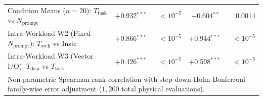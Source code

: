 \begin{table}[t]
\begin{tabular}{l r r r r}
Condition Means ($n=20$): $T_{\text{task}}$ vs $N_{\text{prompt}}$ & +0.932$^{***}$ & $< 10^{-5}$ & +0.604$^{**}$ & 0.0014 \\
Intra-Workload W2 (Fixed $N_{\text{prompt}}$): $T_{\text{orch}}$ vs Instr & +0.866$^{***}$ & $< 10^{-5}$ & +0.944$^{***}$ & $< 10^{-5}$ \\
Intra-Workload W3 (Vector I/O): $T_{\text{disp}}$ vs $T_{\text{task}}$ & +0.426$^{***}$ & $< 10^{-5}$ & +0.598$^{***}$ & $< 10^{-5}$ \\
\hline
\multicolumn{5}{l}{\footnotesize Non-parametric Spearman rank correlation with step-down Holm-Bonferroni family-wise error adjustment ($1{,}200$ total physical evaluations).} \\
\hline
\end{tabular}
\end{table}
